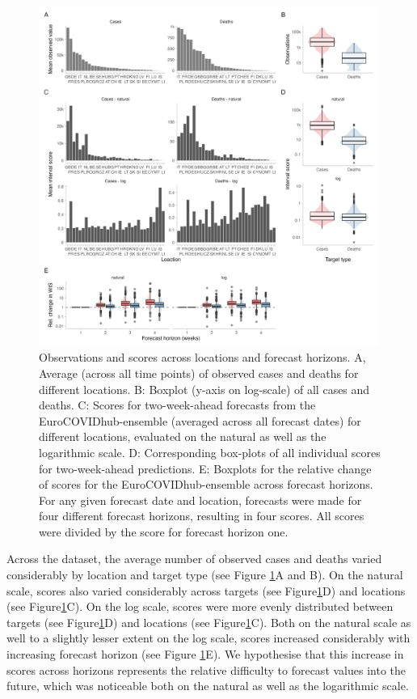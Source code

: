 \documentclass{article}
\begin{document}
\begin{figure}[h!]
    \centering
    \includegraphics[width=0.99\textwidth]{output/figures/HUB-mean-obs-location.png}
    \caption{Observations and scores across locations and forecast horizons. A, Average (across all time points) of observed cases and deaths for different locations. B: Boxplot (y-axis on log-scale) of all cases and deaths. C: Scores for two-week-ahead forecasts from the EuroCOVIDhub-ensemble (averaged across all forecast dates) for different locations, evaluated on the natural as well as the logarithmic scale. D: Corresponding box-plots of all individual scores for two-week-ahead predictions. E: Boxplots for the relative change of scores for the EuroCOVIDhub-ensemble across forecast horizons. For any given forecast date and location, forecasts were made for four different forecast horizons, resulting in four scores. All scores were divided by the score for forecast horizon one.}
    \label{fig:HUB-mean-locations}
\end{figure}

Across the dataset, the average number of observed cases and deaths varied considerably by location and target type (see Figure \ref{fig:HUB-mean-locations}A and B). On the natural scale, scores also varied considerably across targets (see Figure\ref{fig:HUB-mean-locations}D) and locations (see Figure\ref{fig:HUB-mean-locations}C). On the log scale, scores were more evenly distributed between targets (see Figure\ref{fig:HUB-mean-locations}D) and locations (see Figure\ref{fig:HUB-mean-locations}C). Both on the natural scale as well to a slightly lesser extent on the log scale, scores increased considerably with increasing forecast horizon (see Figure \ref{fig:HUB-mean-locations}E). We hypothesise that this increase in scores across horizons represents the relative difficulty to forecast values into the future, which was noticeable both on the natural as well as the logarithmic scale. 
\end{document}
